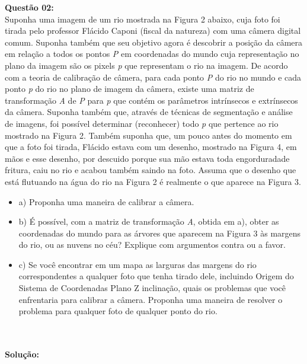 \vspace{0.5 cm}
\noindent\textbf{Questão 02:} \\
Suponha uma imagem de um rio mostrada na Figura 2 abaixo, cuja foto foi tirada pelo professor Flácido Caponi (fiscal da natureza) com uma câmera digital comum. Suponha também que seu objetivo agora é descobrir a posição da câmera em relação a todos os pontos \emph{P} em coordenadas do mundo cuja representação no plano da imagem são os pixels \emph{p} que representam o rio na imagem. De acordo com a teoria de calibração de câmera, para cada ponto \emph{P} do rio no mundo e cada ponto \emph{p} do rio no plano de imagem da câmera, existe uma matriz de transformação \emph{A} de \emph{P} para \emph{p} que contém os parâmetros intrínsecos e extrínsecos da câmera. Suponha também que, através de técnicas de segmentação e análise de imagens, foi possível determinar (reconhecer) todo \emph{p} que pertence ao rio mostrado na Figura 2. Também suponha que, um pouco antes do momento em que a foto foi tirada, Flácido estava com um desenho, mostrado na Figura 4, em mãos e esse desenho, por descuido porque sua mão estava toda engorduradade fritura, caiu no rio e acabou também saindo na foto. Assuma que o desenho que está flutuando na água do rio na Figura 2 é realmente o que aparece na Figura 3.
\begin{itemize}
    \item a) Proponha uma maneira de calibrar a câmera.
    \item b) É possível, com a matriz de transformação \emph{A}, obtida em a), obter as coordenadas do mundo para as árvores que aparecem na Figura 3 às margens do rio, ou as nuvens no céu? Explique com argumentos contra ou a favor.
    \item c) Se você encontrar em um mapa as larguras das margens do rio correspondentes a qualquer foto que tenha tirado dele, incluindo Origem do Sistema de Coordenadas Plano Z inclinação, quais os problemas que você enfrentaria para calibrar a câmera. Proponha uma maneira de resolver o problema para qualquer foto de qualquer ponto do rio.
\end{itemize}
\\
\\
\noindent\textbf{Solução:}\\
